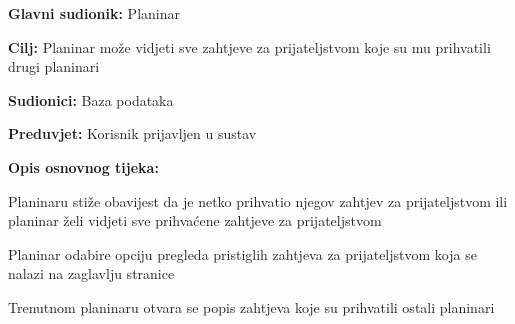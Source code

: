 		\noindent {}
		\begin{packed_item}
			
			\item \textbf{Glavni sudionik: }$ $Planinar$ $
			\item  \textbf{Cilj:} $ $Planinar može vidjeti sve zahtjeve za prijateljstvom koje su mu prihvatili drugi planinari $ $
			\item  \textbf{Sudionici:} $ $Baza podataka $ $
			\item  \textbf{Preduvjet:} $ $Korisnik prijavljen u sustav$ $
			\item  \textbf{Opis osnovnog tijeka:}
			
			\item[] \begin{packed_enum}
				
				\item $ $Planinaru stiže obavijest da je netko prihvatio njegov zahtjev za prijateljstvom ili planinar želi vidjeti sve prihvaćene zahtjeve za prijateljstvom$ $
				\item $ $Planinar odabire opciju pregleda pristiglih zahtjeva za prijateljstvom koja se nalazi na zaglavlju stranice$ $
				\item $ $Trenutnom planinaru otvara se popis zahtjeva koje su prihvatili ostali planinari$ $
				
			\end{packed_enum}
		\end{packed_item}

